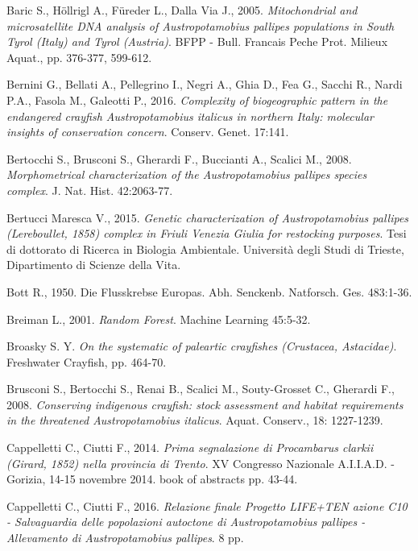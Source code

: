 \documentclass[11pt,a4paper,italian,twoside,openany]{memoir}
\begin{document}
\begin{thebibliography}{9}
 Baric S., Höllrigl A., Füreder L., Dalla Via J., 2005. \emph{Mitochondrial and microsatellite DNA analysis of Austropotamobius pallipes populations in South Tyrol (Italy) and Tyrol (Austria)}. BFPP - Bull. Francais Peche Prot. Milieux Aquat., pp. 376-377, 599-612.

 Bernini G., Bellati A., Pellegrino I., Negri A., Ghia D., Fea G., Sacchi R., Nardi P.A., Fasola M., Galeotti P., 2016. \emph{Complexity of biogeographic pattern in the endangered crayfish Austropotamobius italicus in northern Italy: molecular insights of conservation concern}. Conserv. Genet. 17:141. 

 Bertocchi S., Brusconi S., Gherardi F., Buccianti A., Scalici M., 2008. \emph{Morphometrical characterization of the Austropotamobius pallipes species complex}. J. Nat. Hist. 42:2063-77.

 Bertucci Maresca V., 2015. \emph{Genetic characterization of Austropotamobius pallipes (Lereboullet, 1858) complex in Friuli Venezia Giulia for restocking purposes}. Tesi di dottorato di Ricerca in Biologia Ambientale. Università degli Studi di Trieste, Dipartimento di Scienze della Vita.

 Bott R., 1950. Die Flusskrebse Europas. Abh. Senckenb. Natforsch. Ges. 483:1-36.

 Breiman L., 2001. \emph{Random Forest}. Machine Learning 45:5-32. 

 Broasky S. Y. \emph{On the systematic of paleartic crayfishes (Crustacea, Astacidae)}. Freshwater Crayfish, pp. 464-70.

 Brusconi S., Bertocchi S., Renai B., Scalici M., Souty-Grosset C., Gherardi F., 2008. \emph{Conserving indigenous crayfish: stock assessment and habitat requirements in the threatened Austropotamobius italicus}. Aquat. Conserv., 18: 1227-1239. 

 Cappelletti C., Ciutti F., 2014. \emph{Prima segnalazione di Procambarus clarkii (Girard, 1852) nella provincia di Trento}. XV Congresso Nazionale A.I.I.A.D. - Gorizia, 14-15 novembre 2014. book of abstracts pp. 43-44.

 Cappelletti C., Ciutti F., 2016. \emph{Relazione finale Progetto LIFE+TEN azione C10 - Salvaguardia delle popolazioni autoctone di Austropotamobius pallipes - Allevamento di Austropotamobius pallipes}. 8 pp.


\end{thebibliography}
\end{document}
